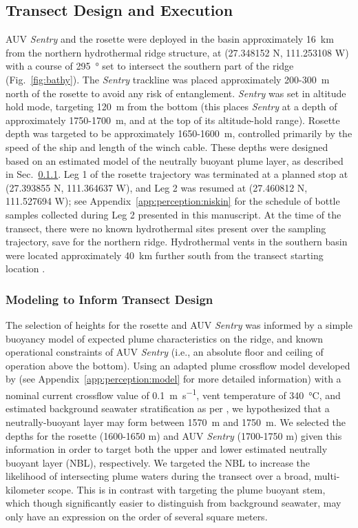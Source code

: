 \subsection{Transect Design and Execution}
AUV \emph{Sentry} and the rosette were deployed in the basin approximately \SI{16}{\kilo\meter} from the northern hydrothermal ridge structure, at (27.348152 N, 111.253108 W) with a course of \SI{295}{\degree} set to intersect the southern part of the ridge (Fig.~\ref{fig:bathy}). The \emph{Sentry} trackline was placed approximately 200-\SI{300}{\meter} north of the rosette to avoid any risk of entanglement. \emph{Sentry} was set in altitude hold mode, targeting \SI{120}{\meter} from the bottom (this places \emph{Sentry} at a depth of approximately 1750-\SI{1700}{\meter}, and at the top of its altitude-hold range). Rosette depth was targeted to be approximately 1650-\SI{1600}{\meter}, controlled primarily by the speed of the ship and length of the winch cable. These depths were designed based on an estimated model of the neutrally buoyant plume layer, as described in Sec.~\ref{sec:model}. Leg 1 of the rosette trajectory was terminated at a planned stop at (27.393855 N, 111.364637 W), and Leg 2 was resumed at (27.460812 N, 111.527694 W); see Appendix~\ref{app:perception:niskin} for the schedule of bottle samples collected during Leg 2 presented in this manuscript. At the time of the transect, there were no known hydrothermal sites present over the sampling trajectory, save for the northern ridge. Hydrothermal vents in the southern basin were located approximately \SI{40}{\kilo\meter} further south from the transect starting location \cite{teske2016guaymas}.

\subsubsection{Modeling to Inform Transect Design}
\label{sec:model}
The selection of heights for the rosette and AUV \emph{Sentry} was informed by a simple buoyancy model of expected plume characteristics on the ridge, and known operational constraints of AUV \emph{Sentry} (i.e., an absolute floor and ceiling of operation above the bottom). Using an adapted plume crossflow model developed by \cite{tohidi2016highly} (see Appendix~\ref{app:perception:model} for more detailed information) with a nominal current crossflow value of \SI{0.1}{\meter\per\second}, vent temperature of \SI{340}{\celsius}, and estimated background seawater stratification as per \cite{speer1989model}, we hypothesized that a neutrally-buoyant layer may form between \SI{1570}{\meter} and \SI{1750}{\meter}. We selected the depths for the rosette (1600-1650 m) and AUV \emph{Sentry} (1700-1750 m) given this information in order to target both the upper and lower estimated neutrally buoyant layer (NBL), respectively. We targeted the NBL to increase the likelihood of intersecting plume waters during the transect over a broad, multi-kilometer scope. This is in contrast with targeting the plume buoyant stem, which though significantly easier to distinguish from background seawater, may only have an expression on the order of several square meters.

